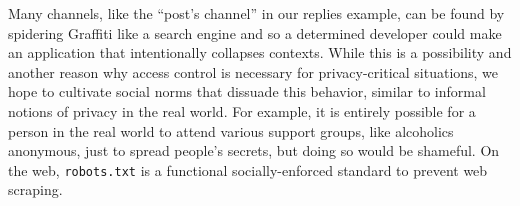 Many channels, like the ``post's channel'' in our replies example,
can be found by spidering Graffiti like a search engine and so a determined
developer could make an application that intentionally collapses contexts.
While this is a possibility and another reason why access control is necessary for privacy-critical situations, we hope to cultivate social norms that dissuade this behavior, similar to informal notions of privacy in the real world.
For example, it is entirely possible for a person in the real world
to attend various support groups, like alcoholics anonymous,
just to spread people's secrets, but doing so would be shameful.
On the web, \texttt{robots.txt} is a functional socially-enforced standard
to prevent web scraping.






